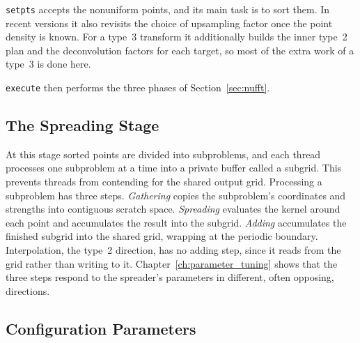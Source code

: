 \texttt{setpts} accepts the nonuniform points, and its main task is to sort
them. In recent versions it also revisits the choice of upsampling factor once
the point density is known. For a type~3 transform it additionally builds the
inner type~2 plan and the deconvolution factors for each target, so most of
the extra work of a type~3 is done here.

\texttt{execute} then performs the three phases of Section~\ref{sec:nufft}.

\subsection{The Spreading Stage}
\label{sec:spreading_stage}

At this stage sorted points are divided into
subproblems, and each thread processes one subproblem at a time into a private
buffer called a subgrid. This prevents threads from contending for the shared
output grid. Processing a subproblem has three steps. \emph{Gathering} copies
the subproblem's coordinates and strengths into contiguous scratch space.
\emph{Spreading} evaluates the kernel around each point and accumulates the
result into the subgrid. \emph{Adding} accumulates the finished subgrid into
the shared grid, wrapping at the periodic boundary. Interpolation, the type~2
direction, has no adding step, since it reads from the grid rather than
writing to it. Chapter~\ref{ch:parameter_tuning} shows that the three steps
respond to the spreader's parameters in different, often opposing, directions.

\subsection{Configuration Parameters}
\label{sec:finufft_parameters}

